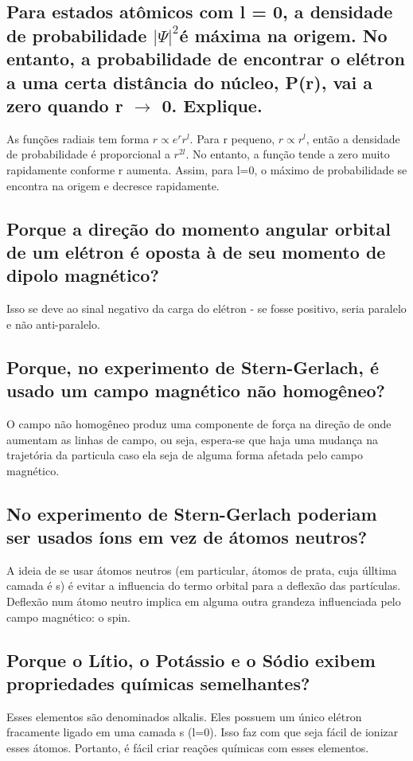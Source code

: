 \documentclass{article}
\begin{document}
\subsection{Para estados atômicos com l = 0, a densidade de probabilidade $|\Psi|^2$é máxima na origem. No entanto, a probabilidade de encontrar o elétron a uma certa distância do núcleo, P(r), vai a zero quando r $\to$ 0. Explique.}
As funções radiais tem forma $r \propto e^{r}r^l$. Para r pequeno, $r \propto r^l$, então a densidade de probabilidade é proporcional a $r^{2l}$. No entanto, a função tende a zero muito rapidamente conforme r aumenta. Assim, para l=0, o máximo de probabilidade se encontra na origem e decresce rapidamente.

\subsection{Porque a direção do momento angular orbital de um elétron é oposta à de seu momento de dipolo magnético?}
Isso se deve ao sinal negativo da carga do elétron - se fosse positivo, seria paralelo e não anti-paralelo.

\subsection{Porque, no experimento de Stern-Gerlach, é usado um campo magnético não homogêneo? }
O campo não homogêneo produz uma componente de força na direção de onde aumentam as linhas de campo, ou seja, espera-se que haja uma mudança na trajetória da particula caso ela seja de alguma forma afetada pelo campo magnético.

\subsection{No experimento de Stern-Gerlach poderiam ser usados íons em vez de átomos neutros?}

A ideia de se usar átomos neutros (em particular, átomos de prata, cuja úlltima camada é s) é evitar a influencia do termo orbital para a deflexão das partículas. Deflexão num átomo neutro implica em alguma outra grandeza influenciada pelo campo magnético: o spin.

\subsection{Porque o Lítio, o Potássio e o Sódio exibem propriedades químicas semelhantes?}
Esses elementos são denominados alkalis. Eles possuem um único elétron fracamente ligado em uma camada s (l=0). Isso faz com que seja fácil de ionizar esses átomos. Portanto, é fácil criar reações químicas com esses elementos.
\end{document}
